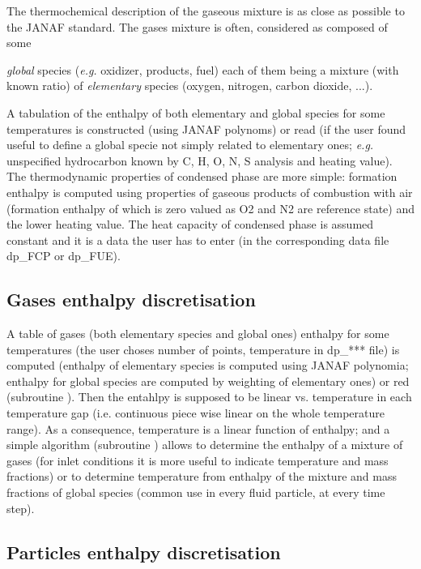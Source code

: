 The thermochemical description of the gaseous mixture is as close as
possible to the JANAF standard. The gases mixture is often, considered as
composed of some {\textit{global} species (\emph{e.g.} oxidizer, products, fuel) each of
them being a mixture (with known ratio) of \textit{elementary} species
(oxygen, nitrogen, carbon dioxide, ...).

A tabulation of the enthalpy of both elementary and global species for some
temperatures is constructed (using JANAF polynoms) or read (if the user found
useful to define a global specie not simply related to elementary ones;
\emph{e.g.} unspecified hydrocarbon known by C, H, O, N, S analysis and heating
value). The thermodynamic properties of condensed phase are more simple:
formation enthalpy is computed using properties of gaseous products of
combustion with air (formation enthalpy of which is zero valued as O2 and N2
are reference state) and the lower heating value. The heat capacity of
condensed phase is assumed constant and it is a data the user has to enter (in
the corresponding data file dp\_FCP or dp\_FUE).

\subsection{Gases enthalpy discretisation}

A table of gases (both elementary species and global ones) enthalpy for some
temperatures (the user choses number of points, temperature in dp\_*** file) is
computed (enthalpy of elementary species is computed using JANAF polynomia;
enthalpy for global species are computed by weighting of elementary ones) or red
(subroutine ). Then the entahlpy is supposed to be linear
vs. temperature in each temperature gap (i.e. continuous piece wise linear on
the whole temperature range). As a consequence, temperature is a linear function
of enthalpy; and a simple algorithm (subroutine ) allows to
determine the enthalpy of a mixture of gases (for inlet conditions it is more
useful to indicate temperature and mass fractions) or to determine temperature
from enthalpy of the mixture and mass fractions of global species (common use in
every fluid particle, at every time step).

\subsection{Particles enthalpy discretisation}

}
